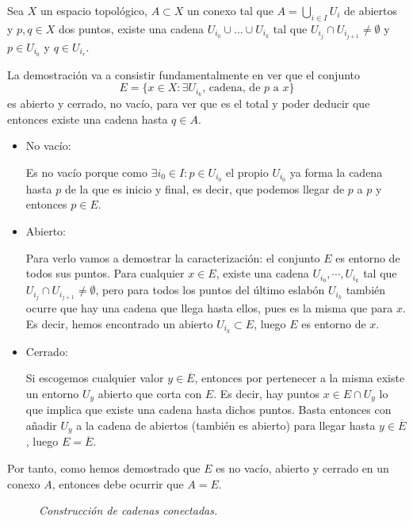 \begin{prop}
Sea $X$ un espacio topológico, $A\subset X$ un conexo tal que $A = \bigcup_{i \in I} U_i$ de abiertos y $p, q \in X$ dos puntos, existe una cadena $U_{i_0} \cup \ldots \cup U_{i_k}$ tal que $U_{i_{j}} \cap U_{i_{j+1}}\neq \emptyset$ y $p \in U_{i_0}$ y $q \in U_{i_r}$. 
\end{prop}
\begin{demo}
La demostración va a consistir fundamentalmente en ver que el conjunto
\[
E = \{x \in X: \exists U_{i_k} \text{, cadena, de } p \text{ a } x\}
\] 
es abierto y cerrado, no vacío, para ver que es el total y poder deducir que entonces existe una cadena hasta $q\in A$.
\begin{itemize}
    \item No vacío: 
   	
   	Es no vacío porque como $\exists i_0 \in I : p\in U_{i_0}$ el propio $U_{i_0}$ ya forma la cadena hasta $p$ de la que es inicio y final, es decir, que podemos llegar de $p$ a $p$ y entonces $p\in E$.
   	
    \item Abierto: 
    
	Para verlo vamos a demostrar la caracterización: el conjunto $E$ es entorno de todos sus puntos. Para cualquier $x\in E$, existe una cadena $U_{i_0}, \cdots, U_{i_k}$ tal que $U_{i_{j}}\cap U_{i_{j+1}} \neq \emptyset$, pero para todos los puntos del último eslabón $U_{i_k}$ también ocurre que hay una cadena que llega hasta ellos, pues es la misma que para $x$. Es decir, hemos encontrado un abierto $U_{i_k}\subset E$, luego $E$ es entorno de $x$.
	
    \item Cerrado:
    
    Si escogemos cualquier valor $y\in \overline{E}$, entonces por pertenecer a la misma existe un entorno $U_y$ abierto que corta con $E$. Es decir, hay puntos $x\in E \cap U_y$ lo que implica que existe una cadena hasta dichos puntos. Basta entonces con añadir $U_y$ a la cadena de abiertos (también es abierto) para llegar hasta $y\in \overline{E}$, luego $E = \overline{E}$.
\end{itemize}
Por tanto, como hemos demostrado que $E$ es no vacío, abierto y cerrado en un conexo $A$, entonces debe ocurrir que $A = E$.
\begin{figure}[H]
    \centering
    \caption{\textit{Construcción de cadenas conectadas.}}
    \label{fig:cadenas-conectadas}
\end{figure}
\end{demo}


